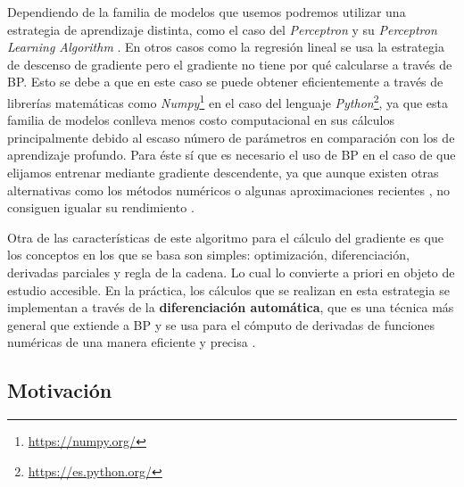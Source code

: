 Dependiendo de la familia de modelos que usemos podremos utilizar una estrategia de aprendizaje distinta, como el caso del \textit{Perceptron} y su \textit{Perceptron Learning Algorithm} \cite{patternrecog}. En otros casos como la regresión lineal se usa la estrategia de descenso de gradiente pero el gradiente no tiene por qué calcularse a través de BP. Esto se debe a que en este caso se puede obtener eficientemente a través de librerías matemáticas como \textit{Numpy}\footnote{\url{https://numpy.org/}} en el caso del lenguaje \textit{Python}\footnote{\url{https://es.python.org/}}, ya que esta familia de modelos conlleva menos costo computacional en sus cálculos principalmente debido al escaso número de parámetros en comparación con los de aprendizaje profundo. Para éste sí que es necesario el uso de BP en el caso de que elijamos entrenar mediante gradiente descendente, ya que aunque existen otras alternativas como los métodos numéricos o algunas aproximaciones recientes , no consiguen igualar su rendimiento \cite{EffBackProp, GoodFellowBook, alternativabacknumerical, alternativabackprop1}.


Otra de las características de este algoritmo para el cálculo del gradiente es que los conceptos en los que se basa son simples: optimización, diferenciación, derivadas parciales y regla de la cadena. Lo cual lo convierte a priori en objeto de estudio accesible. En la práctica, los cálculos que se realizan en esta estrategia se implementan a través de la\textbf{ diferenciación automática}, que es una técnica más general que extiende a BP y se usa para el cómputo de derivadas de funciones numéricas de una manera eficiente y precisa \cite{AutomaticDiff}.%



\subsection{Motivación}

